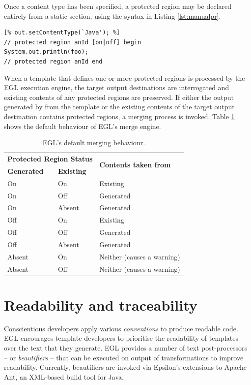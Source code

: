 Once a content type has been specified, a protected region may be declared entirely from a static section, using the syntax  in Listing \ref{lst:manualpr}.

\begin{lstlisting}[basicstyle=\ttfamily\footnotesize, tabsize=2, flexiblecolumns=true, caption=Declaring a protected region from within a static section., label=lst:manualpr]
[% out.setContentType(`Java'); %]
// protected region anId [on|off] begin
System.out.println(foo);
// protected region anId end
\end{lstlisting}

When a template that defines one or more protected regions is
processed by the EGL execution engine, the target output destinations
are interrogated and existing contents of any protected regions are
preserved. If either the output generated by from the template or the
existing contents of the target output destination contains protected
regions, a merging process is invoked. Table \ref{tab:merging} shows
the default behaviour of EGL's merge engine.

\begin{table}[htbp]
  \begin{center}
  \begin{tabular}{|l|l|l|}
  \hline
  \multicolumn{2}{|l|}{\textbf{Protected Region Status}} & \multirow{2}{*}{\textbf{Contents taken from}} \\
  \textbf{Generated} & \textbf{Existing} & \\
  \hline
  On & On     & Existing  \\
  On & Off    & Generated \\
  On & Absent & Generated \\
  \hline
  Off & On     & Existing  \\
  Off & Off    & Generated \\
  Off & Absent & Generated \\
  \hline
  Absent & On  & Neither (causes a warning) \\
  Absent & Off & Neither (causes a warning) \\
  \hline
  \end{tabular}
  \end{center}
\caption{EGL's default merging behaviour.}
\label{tab:merging}
\end{table}

\section{Readability and traceability} 
Conscientious developers apply various \emph{conventions} to produce
readable code.  EGL encourages template developers to prioritise the
readability of templates over the text that they generate. EGL provides a number of text post-processors -- or
\textit{beautifiers} -- that can be executed on output of
transformations to improve readability.  Currently, beautifiers are
invoked via Epsilon's extensions to Apache Ant, an
XML-based build tool for Java.

